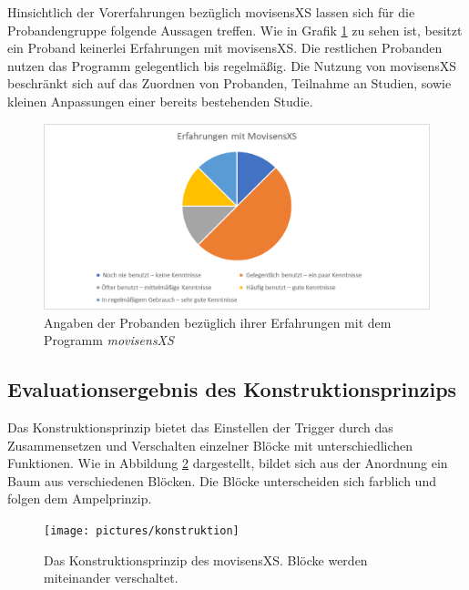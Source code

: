 Hinsichtlich der Vorerfahrungen bezüglich movisensXS lassen sich für die Probandengruppe folgende Aussagen treffen. Wie in Grafik \ref{movisensXSErfahrung} zu sehen ist, besitzt ein Proband keinerlei Erfahrungen mit movisensXS. Die restlichen Probanden nutzen das Programm gelegentlich bis regelmäßig. Die Nutzung von movisensXS beschränkt sich auf das Zuordnen von Probanden, Teilnahme an Studien, sowie kleinen Anpassungen einer bereits bestehenden Studie. 

\begin{figure}[h]
\centering
\includegraphics[width=1\textwidth]{pictures/diagramme/movi}
\caption{Angaben der Probanden bezüglich ihrer Erfahrungen mit dem Programm \emph{movisensXS}}
\label{movisensXSErfahrung}
\end{figure}


\subsection{Evaluationsergebnis des Konstruktionsprinzips}
Das Konstruktionsprinzip bietet das Einstellen der Trigger durch das Zusammensetzen und Verschalten einzelner Blöcke mit unterschiedlichen Funktionen. Wie in Abbildung \ref{konstruktion} dargestellt, bildet sich aus der Anordnung ein Baum aus verschiedenen Blöcken. Die Blöcke unterscheiden sich farblich und folgen dem Ampelprinzip.  

\begin{figure}[h]
\centering
\texttt{[image: pictures/konstruktion]}
\caption{Das Konstruktionsprinzip des movisensXS. Blöcke werden miteinander verschaltet.}
\label{konstruktion}
\end{figure}

